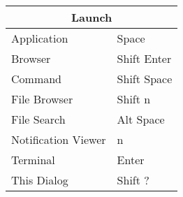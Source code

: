 \documentclass[12pt,paper=portrait,paper=a4]{scrartcl}
\begin{document}
\pagestyle{empty}


    \begin{tabular}{ll}
         \multicolumn{2}{c}{Launch} \\
         \hline
         Application         & \faWindows{} Space\\
         Browser             & \faWindows{} Shift Enter\\
         Command             & \faWindows{} Shift Space\\
         File Browser        & \faWindows{} Shift n\\
         File Search         & \faWindows{} Alt Space\\
         Notification Viewer & \faWindows{} n\\
         Terminal            & \faWindows{} Enter\\
         This Dialog         & \faWindows{} Shift ?
    \end{tabular}
\end{document}
